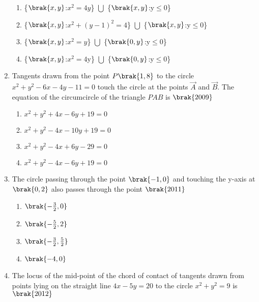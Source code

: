 \begin{enumerate}
\begin{multicols}{2}
\begin{enumerate}
         \item \{$\brak{x, y}$:$x^2=4y$\} $\bigcup$ \{$\brak{x, y}$:y$\le$0\}
         \item \{$\brak{x, y}$:$x^2+(y-1)^2=4$\} $\bigcup$ \{$\brak{x, y}$:y$\le$0\}
         \item \{$\brak{x, y}$:$x^2=y$\} $\bigcup$ \{$\brak{0, y}$:y$\le$0\}
         \item \{$\brak{x, y}$:$x^2=4$y\} $\bigcup$ \{$\brak{0, y}$:y$\le$0\}
         \end{enumerate}
         \end{multicols}
         \item Tangents drawn from the point $P\brak{1, 8}$ to the circle $x^2+y^2-6x-4y-11=0$ touch the circle at the points $\vec{A}$ and $\vec{B}$. The equation of the circumcircle of the triangle $PAB$ is
             \hfill$\brak{2009}$
             \begin{multicols}{2}
         \begin{enumerate}
             \item $x^2+y^2+4x-6y+19=0$
             \item $x^2+y^2-4x-10y+19=0$
             \item $x^2+y^2-4x+6y-29=0$
             \item $x^2+y^2-4x-6y+19=0$
             \end{enumerate}
             \end{multicols}
             \item The circle passing through the point $\brak{-1, 0}$ and touching the y-axis at $\brak{0, 2}$ also passes through the point
                 \hfill$\brak{2011}$
                 \begin{multicols}{2}
             \begin{enumerate}
                 \item $\brak{-\frac{3}{2}, 0}$
                 \item $\brak{-\frac{5}{2}, 2}$
                 \item $\brak{-\frac{3}{2}, \frac{5}{2}}$
                 \item $\brak{-4, 0}$
             \end{enumerate}
             \end{multicols}
             \item The locus of the mid-point of the chord of contact of tangents drawn from points lying on the straight line $4x-5y=20$ to the circle $x^2+y^2=9$ is
                 \hfill$\brak{2012}$
                 \begin{multicols}{2}

\end{multicols}
\end{enumerate}
